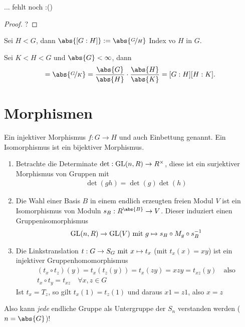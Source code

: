 \begin{proposition}
	... fehlt noch :()
\end{proposition}
\begin{proof}
	?
\end{proof}
\begin{definition}[Index]
	Sei $H < G$, dann $\abs{[G:H]} := \abs{\lnkset{G}{H}}$ Index vo $H$ in $G$.
\end{definition}
\begin{conclusion}
	Sei $K < H < G$ und $\abs{G} < \infty$, dann
	\begin{align*}
		[G:K] = \abs{\lnkset{G}{K}} = \frac{\abs{G}}{\abs{H}}\cdot \frac{\abs{H}}{\abs{K}} = [G:H][H:K].
	\end{align*}
\end{conclusion}
\section{Morphismen}
\begin{definition}
	Ein injektiver Morphismus $f: G \to H$ und auch Einbettung genannt. Ein Isomorphismus ist ein bijektiver Morphismus.
\end{definition}
\begin{example}
	\begin{enumerate}
		\item Betrachte die Determinate $\det: \GL(n,R) \to R^{\times}$, diese ist ein surjektiver Morphismus von Gruppen mit
		\begin{align*}
		\det(gh) = \det(g)\det(h)
		\end{align*}
		\item Die Wahl einer Basis $B$ in einem endlich erzeugten freien Modul $V$ ist ein Isomorphismus von Moduln $s_B: R^{\abs{B}} \to V$. Dieser induziert einen Gruppenisomorphismus
		\begin{align*}
			\GL(n,R) \to \GL(V) \mit g \mapsto s_B \circ M_g \circ s^{-1}_B
		\end{align*}
		\item Die Linkstranslation $t: G \to S_G \mit x \mapsto t_x$ (mit $t_x(x) = xy$) ist ein injektiver Gruppenhomomorphismus
		\begin{align*}
			(t_x \circ t_z)(y) = t_x(t_z (y))=t_x(zy) = xzy = t_{xz}(y) \quad \text{also}\\
			t_x \circ t_y = t_{xz} \quad \forall x,z \in G
		\end{align*}
		Ist $t_x = T_z$, so gilt $t_x(1) = t_z(1)$ und daraus $x1=z1$, also $x=z$
	\end{enumerate}
	Also kann \emph{jede} endliche Gruppe als Untergruppe der $S_n$ verstanden werden ($n = \abs{G}$)!
\end{example}

